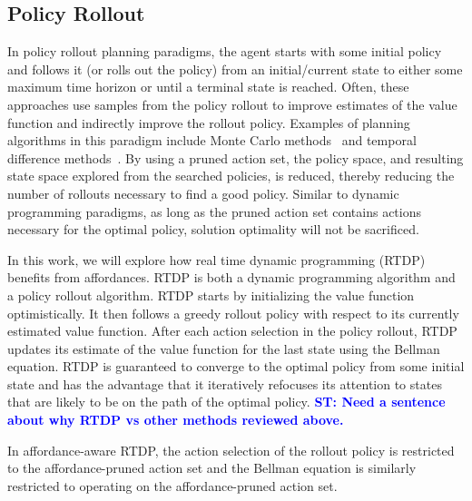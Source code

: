 \documentclass[]{article}
\newcommand{\stnote}[1]{\textcolor{Blue}{\textbf{ST: #1}}}
\begin{document}
\subsection{Policy Rollout}

In policy rollout planning paradigms, the agent starts with some
initial policy and follows it (or rolls out the policy) from an
initial/current state to either some maximum time horizon or until a
terminal state is reached. Often, these approaches use samples from
the policy rollout to improve estimates of the value function and
indirectly improve the rollout policy. Examples of planning algorithms
in this paradigm include Monte Carlo methods~\citep{browne12,
  silver10} and temporal difference
methods~\citep{sutton99,sutton1988lpm,rummery1994line,6313077,lagoudakis2003least,Peters:2008ve}.
By using a pruned
action set, the policy space, and resulting state space explored from
the searched policies, is reduced, thereby reducing the number of
rollouts necessary to find a good policy. Similar to dynamic
programming paradigms, as long as the pruned action set contains
actions necessary for the optimal policy, solution optimality will not
be sacrificed.

In this work, we will explore how real time dynamic programming
(RTDP)~\citep{barto95} benefits from affordances. RTDP is both a
dynamic programming algorithm and a policy rollout algorithm. RTDP
starts by initializing the value function optimistically. It then
follows a greedy rollout policy with respect to its currently
estimated value function. After each action selection in the policy
rollout, RTDP updates its estimate of the value function for the last
state using the Bellman equation. RTDP is guaranteed to converge to
the optimal policy from some initial state and has the advantage that
it iteratively refocuses its attention to states that are likely to be
on the path of the optimal policy.  \stnote{Need a sentence about why
  RTDP vs other methods reviewed above.}

In affordance-aware RTDP, the action selection of the rollout policy
is restricted to the affordance-pruned action set and the Bellman
equation is similarly restricted to operating on the affordance-pruned
action set.



%
%
\end{document}
